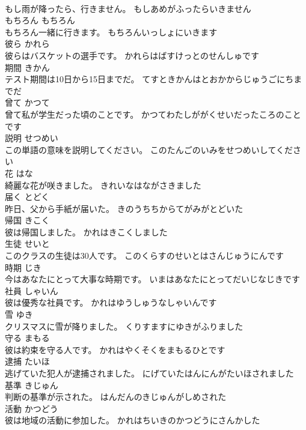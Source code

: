 \documentclass[8pt]{extreport}
\begin{document}
\begin{CJK}{UTF8}{min}
\\	もし雨が降ったら、行きません。	もしあめがふったらいきません	
\\	もちろん	もちろん	
\\	もちろん一緒に行きます。	もちろんいっしょにいきます	
\\	彼ら	かれら	
\\	彼らはバスケットの選手です。	かれらはばすけっとのせんしゅです	
\\	期間	きかん	
\\	テスト期間は10日から15日までだ。	てすときかんはとおかからじゅうごにちまでだ	
\\	曾て	かつて	
\\	曾て私が学生だった頃のことです。	かつてわたしががくせいだったころのことです	
\\	説明	せつめい	
\\	この単語の意味を説明してください。	このたんごのいみをせつめいしてください	
\\	花	はな	
\\	綺麗な花が咲きました。	きれいなはながさきました	
\\	届く	とどく	
\\	昨日、父から手紙が届いた。	きのうちちからてがみがとどいた	
\\	帰国	きこく	
\\	彼は帰国しました。	かれはきこくしました	
\\	生徒	せいと	
\\	このクラスの生徒は30人です。	このくらすのせいとはさんじゅうにんです	
\\	時期	じき	
\\	今はあなたにとって大事な時期です。	いまはあなたにとってだいじなじきです	
\\	社員	しゃいん	
\\	彼は優秀な社員です。	かれはゆうしゅうなしゃいんです	
\\	雪	ゆき	
\\	クリスマスに雪が降りました。	くりすますにゆきがふりました	
\\	守る	まもる	
\\	彼は約束を守る人です。	かれはやくそくをまもるひとです	
\\	逮捕	たいほ	
\\	逃げていた犯人が逮捕されました。	にげていたはんにんがたいほされました	
\\	基準	きじゅん	
\\	判断の基準が示された。	はんだんのきじゅんがしめされた	
\\	活動	かつどう	
\\	彼は地域の活動に参加した。	かれはちいきのかつどうにさんかした	

\end{CJK}
\end{document}
